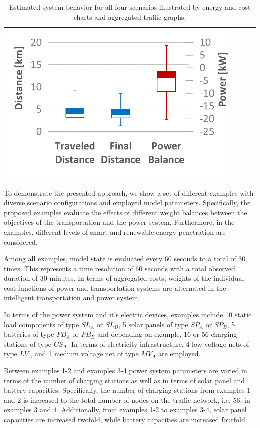 \begin{table}[b]
\begin{tabularx}{\textwidth}{|Y|Y|Y|Y|}
		\includegraphics[trim=0 0 0 -3,scale=0.285]{../gfx/data/image001.png} \\ \hline
		
	\end{tabularx}
	\caption{Estimated system behavior for all four scenarios illustrated by energy and cost charts and aggregated traffic graphs.}
	\label{figure:examples}
\end{table}


To demonstrate the presented approach, we show a set of different examples with diverse scenario configurations and employed model parameters. Specifically, the proposed examples evaluate the effects of different weight balances between the objectives of the transportation and the power system. 
Furthermore, in the examples, different levels of smart and renewable energy penetration are considered. 

Among all examples, model state is evaluated every 60 seconds to a total of 30 times. This represents a time resolution of 60 seconds with a total observed duration of 30 minutes. 
In terms of aggregated costs, weights of the individual cost functions of power and transportation systems are alternated in the intelligent transportation and power system.

In terms of the power system and it's electric devices, examples include 10 static load components of type $SL_{A}$ or $SL_{B}$, 5 solar panels of type $SP_{A}$ or $SP_{B}$, 5 batteries of type $PB_{A}$ or $PB_{B}$ and depending on example, 16 or 56 charging stations of type $CS_{A}$. In terms of electricity infrastructure, 4 low voltage nets of type $LV_{A}$ and 1 medium voltage net of type $MV_{A}$ are employed. 

Between examples 1-2 and examples 3-4 power system parameters are varied in terms of the number of charging stations as well as in terms of solar panel and battery capacities. Specifically, the number of charging stations from examples 1 and 2 is increased to the total number of nodes on the traffic network, i.e. 56, in examples 3 and 4. Additionally, from examples 1-2 to examples 3-4, solar panel capacities are increased twofold, while battery capacities are increased fourfold. 

